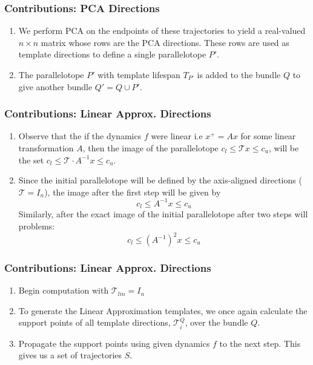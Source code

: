 \documentclass{beamer}
\newcommand{\T}{\mathcal{T}}
\begin{document}
\begin{frame}
    \frametitle{\textbf{Contributions:} PCA Directions}
    \begin{enumerate}
      \item We perform PCA on the endpoints of these trajectories to yield a real-valued $n \times n$ matrix whose rows are the PCA directions. These rows are used as template directions to define a single parallelotope $P'$.
      \item The parallelotope $P'$ with template lifespan $T_{P'}$ is added to the bundle $Q$ to give another bundle $Q' = Q \cup P'$.
    \end{enumerate}
\end{frame}
\begin{frame}
    \frametitle{\textbf{Contributions:} Linear Approx. Directions}
    \begin{enumerate}
      \item Observe that the if the dynamics $f$ were linear i.e $x^+ = Ax$ for some linear transformation $A$, then the image of the parallelotope $c_{l} \leq \T x \leq c_{u}$, will be the set $c_{l} \leq \T \cdot A^{-1} x \leq c_{u}$.
      \item Since the initial parallelotope will be defined by the axis-aligned directions ($\T = I_n$), the image after the first step will be given by
        \[ c_{l} \leq A^{-1} x \leq c_{u}  \]
      Similarly, after the exact image of the initial parallelotope after two steps will problems:
      \[ c_{l} \leq (A^{-1})^2 x \leq c_{u}  \]
    \end{enumerate}
  \end{frame}


\begin{frame}
    \frametitle{\textbf{Contributions:} Linear Approx. Directions}
    \begin{enumerate}
      \item Begin computation with $\T_{lin} = I_n$
      \item To generate the Linear Approximation templates, we once again calculate the support points of all template directions, $\T^Q_i$, over the bundle $Q$.
      \item Propagate the support points using given dynamics $f$ to the next step.   This gives us a set of trajectories $S$.

    \end{enumerate}
\end{frame}
\end{document}
